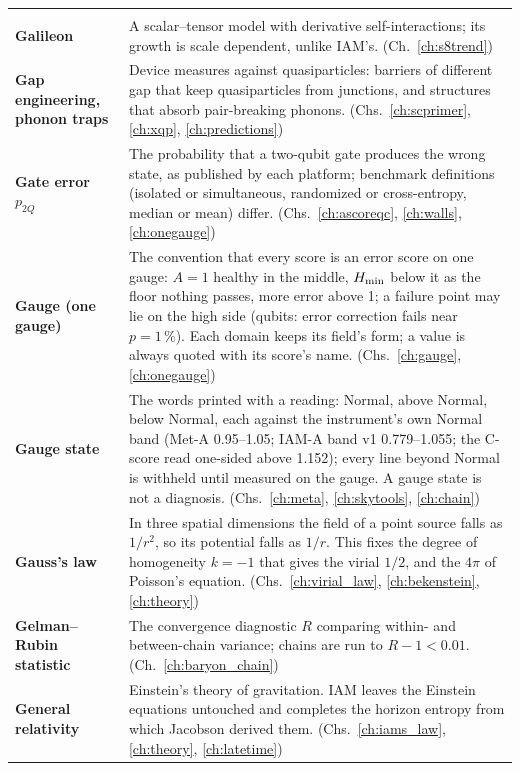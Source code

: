 {\begin{longtable}{@{}>{\raggedright\arraybackslash}p{}>{\raggedright\arraybackslash}p{}@{}}
\multicolumn{2}{@{}l}{\normalsize\textbf{G}}\\[2pt]
\textbf{Galileon} & A scalar--tensor model with derivative self-interactions; its growth is scale dependent, unlike IAM's. {\footnotesize(Ch.~\ref{ch:s8trend})}\\[1pt]
\textbf{Gap engineering, phonon traps} & Device measures against quasiparticles: barriers of different gap that keep quasiparticles from junctions, and structures that absorb pair-breaking phonons. {\footnotesize(Chs.~\ref{ch:scprimer}, \ref{ch:xqp}, \ref{ch:predictions})}\\[1pt]
\textbf{Gate error $p_{2Q}$} & The probability that a two-qubit gate produces the wrong state, as published by each platform; benchmark definitions (isolated or simultaneous, randomized or cross-entropy, median or mean) differ. {\footnotesize(Chs.~\ref{ch:ascoreqc}, \ref{ch:walls}, \ref{ch:onegauge})}\\[1pt]
\textbf{Gauge (one gauge)} & The convention that every score is an error score on one gauge: $A=1$ healthy in the middle, $H_{\min}$ below it as the floor nothing passes, more error above 1; a failure point may lie on the high side (qubits: error correction fails near $p=1\,\%$). Each domain keeps its field's form; a value is always quoted with its score's name. {\footnotesize(Chs.~\ref{ch:gauge}, \ref{ch:onegauge})}\\[1pt]
\textbf{Gauge state} & The words printed with a reading: Normal, above Normal, below Normal, each against the instrument's own Normal band (Met-A 0.95--1.05; IAM-A band v1 0.779--1.055; the C-score read one-sided above 1.152); every line beyond Normal is withheld until measured on the gauge. A gauge state is not a diagnosis. {\footnotesize(Chs.~\ref{ch:meta}, \ref{ch:skytools}, \ref{ch:chain})}\\[1pt]
\textbf{Gauss's law} & In three spatial dimensions the field of a point source falls as $1/r^2$, so its potential falls as $1/r$. This fixes the degree of homogeneity $k=-1$ that gives the virial $1/2$, and the $4\pi$ of Poisson's equation. {\footnotesize(Chs.~\ref{ch:virial_law}, \ref{ch:bekenstein}, \ref{ch:theory})}\\[1pt]
\textbf{Gelman--Rubin statistic} & The convergence diagnostic $R$ comparing within- and between-chain variance; chains are run to $R-1<0.01$. {\footnotesize(Ch.~\ref{ch:baryon_chain})}\\[1pt]
\textbf{General relativity} & Einstein's theory of gravitation. IAM leaves the Einstein equations untouched and completes the horizon entropy from which Jacobson derived them. {\footnotesize(Chs.~\ref{ch:iams_law}, \ref{ch:theory}, \ref{ch:latetime})}\\[1pt]

\end{longtable}}
